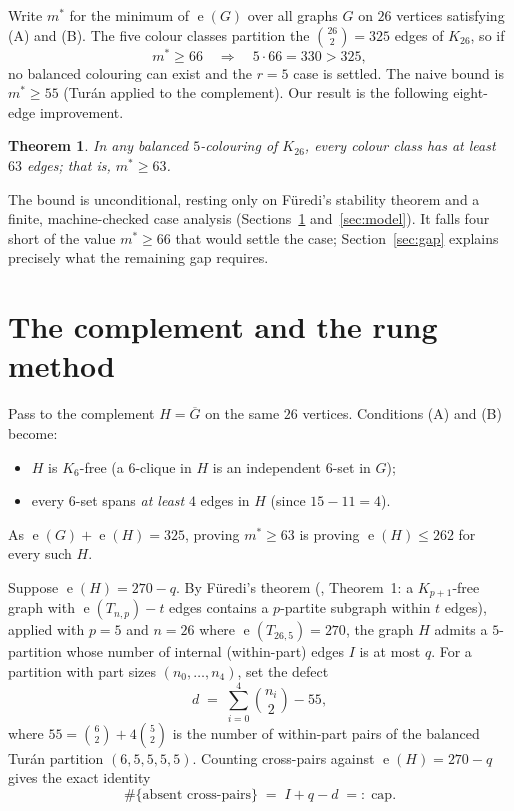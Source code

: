 \documentclass[11pt]{article}
\newtheorem{theorem}{Theorem}
\theoremstyle{definition}
\DeclareMathOperator{\ee}{e}
\newcommand{\mstar}{m^{*}}
\newcommand{\Kn}[1]{K_{#1}}
\begin{document}
Write $\mstar$ for the minimum of $\ee(G)$ over all graphs $G$ on $26$ vertices
satisfying (A) and (B). The five colour classes partition the $\binom{26}{2} = 325$
edges of $\Kn{26}$, so if
\[
  \mstar \ge 66 \quad\Longrightarrow\quad 5 \cdot 66 = 330 > 325,
\]
no balanced colouring can exist and the $r = 5$ case is settled. The naive bound is
$\mstar \ge 55$ (Tur\'an applied to the complement). Our result is the following
eight-edge improvement.

\begin{theorem}\label{thm:main}
In any balanced $5$-colouring of $\Kn{26}$, every colour class has at least
$63$ edges; that is, $\mstar \ge 63$.
\end{theorem}

The bound is unconditional, resting only on F\"uredi's stability theorem
\cite{Fu15} and a finite, machine-checked case analysis (Sections~\ref{sec:rung}
and~\ref{sec:model}). It falls four short of the value $\mstar \ge 66$ that would
settle the case; Section~\ref{sec:gap} explains precisely what the remaining gap
requires.

\section{The complement and the rung method}\label{sec:rung}

Pass to the complement $H = \overline{G}$ on the same $26$ vertices. Conditions
(A) and (B) become:
\begin{itemize}
  \item $H$ is $\Kn{6}$-free (a $6$-clique in $H$ is an independent $6$-set in $G$);
  \item every $6$-set spans \emph{at least} $4$ edges in $H$ (since $15 - 11 = 4$).
\end{itemize}
As $\ee(G) + \ee(H) = 325$, proving $\mstar \ge 63$ is proving $\ee(H) \le 262$ for
every such $H$.

Suppose $\ee(H) = 270 - q$. By F\"uredi's theorem (\cite{Fu15}, Theorem~1: a
$\Kn{p+1}$-free graph with $\ee(T_{n,p}) - t$ edges contains a $p$-partite subgraph
within $t$ edges), applied with $p = 5$ and $n = 26$ where $\ee(T_{26,5}) = 270$,
the graph $H$ admits a $5$-partition whose number of internal (within-part) edges
$I$ is at most $q$. For a partition with part sizes $(n_0, \dots, n_4)$, set the
defect
\[
  d \;=\; \sum_{i=0}^{4} \binom{n_i}{2} - 55,
\]
where $55 = \binom{6}{2} + 4\binom{5}{2}$ is the number of within-part pairs of the
balanced Tur\'an partition $(6,5,5,5,5)$. Counting cross-pairs against
$\ee(H) = 270 - q$ gives the exact identity
\begin{equation}\label{eq:cap}
  \#\{\text{absent cross-pairs}\} \;=\; I + q - d \;=:\; \mathrm{cap}.
\end{equation}
\end{document}
